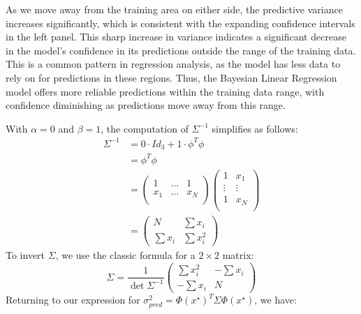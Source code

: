 As we move away from the training area on either side, the predictive variance increases significantly, which is consistent with the expanding confidence intervals in the left panel. This sharp increase in variance indicates a significant decrease in the model's confidence in its predictions outside the range of the training data. This is a common pattern in regression analysis, as the model has less data to rely on for predictions in these regions. Thus, the Bayesian Linear Regression model offers more reliable predictions within the training data range, with confidence diminishing as predictions move away from this range.\newline

With $\alpha = 0$ and $\beta = 1$, the computation of $\Sigma^{-1}$ simplifies as follows:
\begin{align*}
    \Sigma ^{-1} 
        &= 0 \cdot Id_3 + 1 \cdot \phi ^T \phi \\
        &= \phi ^T \phi \\ 
        &= \begin{pmatrix}
            1 & \dots & 1 \\
            x_1 & \dots & x_N \\
        \end{pmatrix} \begin{pmatrix}
            1 & x_1 \\
            \vdots & \vdots \\
            1 & x_N \\
        \end{pmatrix} \\
        &= \begin{pmatrix}
            N & \sum x_i \\
            \sum x_i & \sum x_i^2
        \end{pmatrix}
\end{align*}
To invert $\Sigma$, we use the classic formula for a $2 \times 2$ matrix:
\[
\Sigma = \frac{1}{\det \Sigma^{-1}} \begin{pmatrix}
        \sum x_i^2 & - \sum x_i \\
        - \sum x_i & N
    \end{pmatrix}
\]
Returning to our expression for $ \sigma^2_{pred} = \Phi (x^\star ) ^T \Sigma \Phi (x^\star )$, we have:
